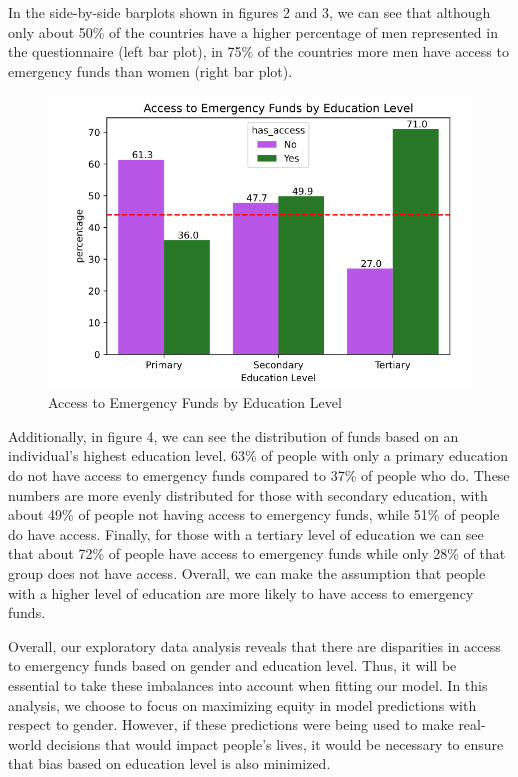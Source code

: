 \documentclass[water,article,submit,moreauthors,pdftex]{mdpi}
\begin{document}
In the side-by-side barplots shown in figures 2 and 3, we can see that
although only about 50\% of the countries have a higher percentage of
men represented in the questionnaire (left bar plot), in 75\% of the
countries more men have access to emergency funds than women (right bar
plot).

\begin{figure}
\centering
\includegraphics[width=\textwidth,height=0.5\textheight]{images/access_by_educ_level.png}
\caption{Access to Emergency Funds by Education Level}
\end{figure}

Additionally, in figure 4, we can see the distribution of funds based on
an individual's highest education level. 63\% of people with only a
primary education do not have access to emergency funds compared to 37\%
of people who do. These numbers are more evenly distributed for those
with secondary education, with about 49\% of people not having access to
emergency funds, while 51\% of people do have access. Finally, for those
with a tertiary level of education we can see that about 72\% of people
have access to emergency funds while only 28\% of that group does not
have access. Overall, we can make the assumption that people with a
higher level of education are more likely to have access to emergency
funds.

Overall, our exploratory data analysis reveals that there are
disparities in access to emergency funds based on gender and education
level. Thus, it will be essential to take these imbalances into account
when fitting our model. In this analysis, we choose to focus on
maximizing equity in model predictions with respect to gender. However,
if these predictions were being used to make real-world decisions that
would impact people's lives, it would be necessary to ensure that bias
based on education level is also minimized.
\end{document}
